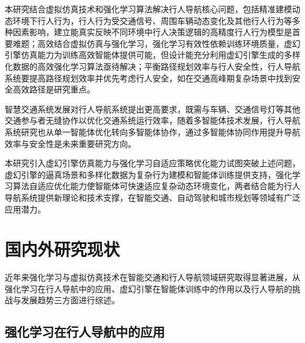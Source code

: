 本研究结合虚拟仿真技术和强化学习算法解决行人导航核心问题，包括精准建模动态环境下行人行为，行人行为受交通信号、周围车辆动态变化及其他行人行为等多种因素影响，建立能真实反映不同环境中行人决策逻辑的高精度行人行为模型是首要难题；高效结合虚拟仿真与强化学习，强化学习有效性依赖训练环境质量，虚幻引擎仿真能力为训练高效智能体提供可能，但设计能充分利用虚幻引擎生成的多样化数据的高效强化学习算法亟待解决；平衡路径规划效率与行人安全性，行人导航系统要提高路径规划效率并优先考虑行人安全，如在交通高峰期复杂场景中找到安全高效路径是研究重点。

智慧交通系统发展对行人导航系统提出更高要求，既需与车辆、交通信号灯等其他交通参与者无缝协作以优化交通系统运行效率，随着多智能体技术发展，行人导航系统研究也从单一智能体优化转向多智能体协作，通过多智能体协同作用提升导航效率与安全性是未来重要研究方向。

本研究引入虚幻引擎仿真能力与强化学习自适应策略优化能力试图突破上述问题，虚幻引擎的逼真场景和多样化数据为复杂行为建模和智能体训练提供支持，强化学习算法自适应优化能力使智能体可快速适应复杂动态环境变化，两者结合能为行人导航系统提供新理论和技术支撑，在智能交通、自动驾驶和城市规划等领域有广泛应用潜力。

\section{国内外研究现状}

近年来强化学习与虚拟仿真技术在智能交通和行人导航领域研究取得显著进展，从强化学习在行人导航中的应用、虚幻引擎在智能体训练中的作用以及行人导航的挑战与发展趋势三方面进行综述。

\subsection{强化学习在行人导航中的应用}

